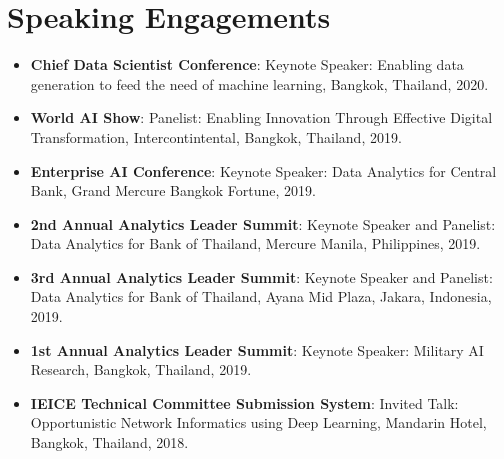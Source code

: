 \documentclass[letterpaper,11pt]{article}
\newcommand{\resumeItem}[2]{
  \item\small{
    \textbf{#1}{: #2 \vspace{-2pt}}
  }
}
\newcommand{\resumeSubItem}[2]{\resumeItem{#1}{#2}\vspace{-4pt}}
\newcommand{\resumeSubHeadingListStart}{\begin{itemize}[leftmargin=*]}
\newcommand{\resumeSubHeadingListEnd}{\end{itemize}}
\begin{document}
\begin{refsection}
	\nocite{Kerdsri2018}
  \nocite{7886152}
  \nocite{7332543}
  \nocite{Kerdsri2012}
  \nocite{6427357}
  \nocite{6174610}
  \nocite{waset2010}
	\AtNextBibliography{\small}
	\printbibliography[title={Conference Proceedings}]
\end{refsection}

\begin{refsection}
  \nocite{book2013}
  \nocite{book2013a}
  \nocite{book2012}
  \nocite{book2012a}
  \nocite{book2012b}
  \nocite{book2007}
  \nocite{kerdsri2003snmp}
	\AtNextBibliography{\small}
	\printbibliography[title={Books}]
\end{refsection}

\section{Speaking Engagements}
  \resumeSubHeadingListStart
  \resumeSubItem{Chief Data Scientist Conference}
    {Keynote Speaker: Enabling data generation to feed the need of machine learning, Bangkok, Thailand, 2020.}
    \resumeSubItem{World AI Show}
      {Panelist: Enabling Innovation Through Effective Digital Transformation, Intercontintental, Bangkok, Thailand, 2019.}
    \resumeSubItem{Enterprise AI Conference}
      {Keynote Speaker: Data Analytics for Central Bank, Grand Mercure Bangkok Fortune, 2019.}
     \resumeSubItem{2nd Annual Analytics Leader Summit}
      {Keynote Speaker and Panelist: Data Analytics for Bank of Thailand, Mercure Manila, Philippines, 2019.}
    \resumeSubItem{3rd Annual Analytics Leader Summit}
      {Keynote Speaker and Panelist: Data Analytics for Bank of Thailand, Ayana Mid Plaza, Jakara, Indonesia, 2019.}
    \resumeSubItem{1st Annual Analytics Leader Summit}
      {Keynote Speaker: Military AI Research, Bangkok, Thailand, 2019.}
    \resumeSubItem{IEICE Technical Committee Submission System}
      {Invited Talk: Opportunistic Network Informatics using Deep Learning, Mandarin Hotel, Bangkok, Thailand, 2018.}

  \resumeSubHeadingListEnd
\end{document}
